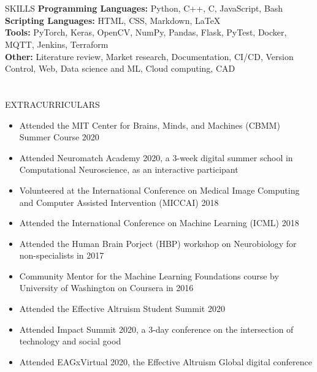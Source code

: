 \documentclass{my_cv}
\begin{document}
\section{\faList}{SKILLS}
    \textbf{Programming Languages:} Python, C++, C, JavaScript, Bash \\
    \textbf{Scripting Languages:} HTML, CSS, Markdown, \LaTeX \\
    \noindent\textbf{Tools:} PyTorch, Keras, OpenCV, NumPy, Pandas, Flask, PyTest, Docker, MQTT, Jenkins, Terraform \\
    \noindent\textbf{Other:} Literature review, Market research, Documentation, CI/CD, Version Control, Web, Data science and ML, Cloud computing, CAD

\section{\faStar}{EXTRACURRICULARS}
    \begin{itemize}
        \item Attended the MIT Center for Brains, Minds, and Machines (CBMM) Summer Course 2020
        \item Attended Neuromatch Academy 2020, a 3-week digital summer school in Computational Neuroscience, as an interactive participant
        \item Volunteered at the International Conference on Medical Image Computing and Computer Assisted Intervention (MICCAI) 2018
        \item Attended the International Conference on Machine Learning (ICML) 2018
        \item Attended the Human Brain Porject (HBP) workshop on Neurobiology for non-specialists in 2017
        \item Community Mentor for the Machine Learning Foundations course by University of Washington on Coursera in 2016
        \item Attended the Effective Altruism Student Summit 2020
        \item Attended Impact Summit 2020, a 3-day conference on the intersection of technology and social good
        \item Attended EAGxVirtual 2020, the Effective Altruism Global digital conference
    \end{itemize}
\end{document}
